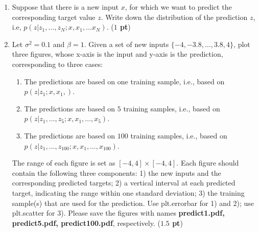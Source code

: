 \documentclass[twoside]{article}
\begin{document}
\begin{enumerate}
\item Suppose that there is a new input $x$, for which we want to predict the corresponding target value $z$. Write down the distribution of the prediction $z$, i.e, $p(z|z_1,\ldots,z_N ; x, x_1, \ldots x_N)$. ({\bf $1$ pt})
  \begin{center}
\end{center}
 
\newpage

\item Let $\sigma^2=0.1$ and $\beta=1$. Given a set of new inputs $\{-4,-3.8,\ldots,3.8,4\}$, plot three figures, whose x-axis is the input and y-axis is the prediction, corresponding to three cases:
    \begin{enumerate}
    \item The predictions are based on one training sample, i.e., based on $p(z|z_1;x,x_1,)$.
    \item The predictions are based on $5$ training samples, i.e., based on $p(z|z_1,\ldots,z_{5};x,x_1,\ldots,x_{5})$.
    \item The predictions are based on $100$ training samples, i.e., based on  $p(z|z_1,\ldots,z_{100};x,x_1,\ldots,x_{100})$.
    \end{enumerate}

     The range of each figure is set as $[-4, 4]\times [-4, 4]$. Each figure should contain the following three components: 1) the new inputs and the corresponding predicted targets; 2) a vertical interval at each predicted target, indicating the range within one standard deviation; 3) the training sample(s) that are used for the prediction. Use \textsf{plt.errorbar} for 1) and 2); use \textsf{plt.scatter} for 3). Please save the figures with names \textbf{predict1.pdf, predict5.pdf, predict100.pdf}, respectively. ({\bf $1.5$ pt})

\end{enumerate}
\end{document}
